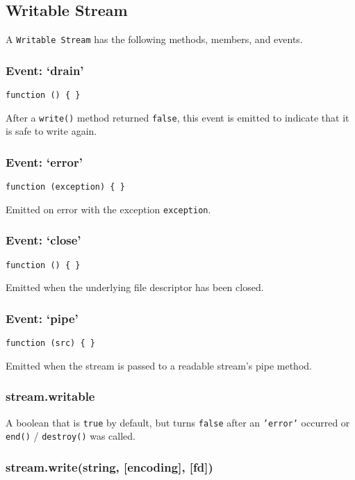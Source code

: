 \subsection{Writable Stream}

A \texttt{Writable Stream} has the following methods, members, and
events.

\subsubsection{Event: `drain'}

\texttt{function () \{ \}}

After a \texttt{write()} method returned \texttt{false}, this event is
emitted to indicate that it is safe to write again.

\subsubsection{Event: `error'}

\texttt{function (exception) \{ \}}

Emitted on error with the exception \texttt{exception}.

\subsubsection{Event: `close'}

\texttt{function () \{ \}}

Emitted when the underlying file descriptor has been closed.

\subsubsection{Event: `pipe'}

\texttt{function (src) \{ \}}

Emitted when the stream is passed to a readable stream's pipe method.

\subsubsection{stream.writable}

A boolean that is \texttt{true} by default, but turns \texttt{false}
after an \texttt{'error'} occurred or \texttt{end()} /
\texttt{destroy()} was called.

\subsubsection{stream.write(string, {[}encoding{]}, {[}fd{]})}

